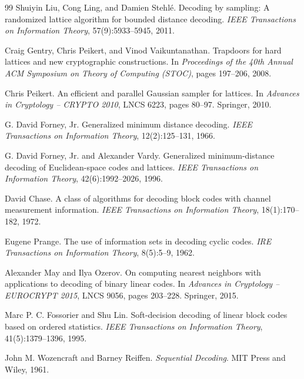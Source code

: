 \documentclass[10pt]{article}
\theoremstyle{definition}
\begin{document}
\begin{thebibliography}{99}
   Shuiyin Liu, Cong Ling, and Damien Stehl\'e.
   \newblock Decoding by sampling: A randomized lattice algorithm for bounded
   distance decoding.
   \newblock \emph{IEEE Transactions on Information Theory},
   57(9):5933--5945, 2011.

   Craig Gentry, Chris Peikert, and Vinod Vaikuntanathan.
   \newblock Trapdoors for hard lattices and new cryptographic constructions.
   \newblock In \emph{Proceedings of the 40th Annual ACM Symposium on Theory
   of Computing (STOC)}, pages 197--206, 2008.

   Chris Peikert.
   \newblock An efficient and parallel Gaussian sampler for lattices.
   \newblock In \emph{Advances in Cryptology -- CRYPTO 2010}, LNCS 6223,
   pages 80--97. Springer, 2010.

   G. David Forney, Jr.
   \newblock Generalized minimum distance decoding.
   \newblock \emph{IEEE Transactions on Information Theory}, 12(2):125--131,
   1966.

   G. David Forney, Jr. and Alexander Vardy.
   \newblock Generalized minimum-distance decoding of Euclidean-space codes and
   lattices.
   \newblock \emph{IEEE Transactions on Information Theory}, 42(6):1992--2026,
   1996.

   David Chase.
   \newblock A class of algorithms for decoding block codes with channel
   measurement information.
   \newblock \emph{IEEE Transactions on Information Theory}, 18(1):170--182,
   1972.

   Eugene Prange.
   \newblock The use of information sets in decoding cyclic codes.
   \newblock \emph{IRE Transactions on Information Theory}, 8(5):5--9, 1962.

   Alexander May and Ilya Ozerov.
   \newblock On computing nearest neighbors with applications to decoding of
   binary linear codes.
   \newblock In \emph{Advances in Cryptology -- EUROCRYPT 2015}, LNCS 9056,
   pages 203--228. Springer, 2015.

   Marc P. C. Fossorier and Shu Lin.
   \newblock Soft-decision decoding of linear block codes based on ordered
   statistics.
   \newblock \emph{IEEE Transactions on Information Theory}, 41(5):1379--1396,
   1995.

   John M. Wozencraft and Barney Reiffen.
   \newblock \emph{Sequential Decoding}.
   \newblock MIT Press and Wiley, 1961.


\end{thebibliography}
\end{document}
